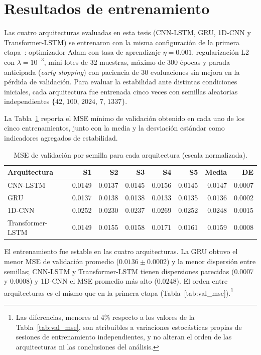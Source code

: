 \documentclass{report}
\begin{document}

\section{Resultados de entrenamiento}
\label{sec:resultados_entrenamiento}

Las cuatro arquitecturas evaluadas en esta tesis (CNN-LSTM, GRU, 1D-CNN y Transformer-LSTM) se entrenaron con la misma configuración de la primera etapa~\cite{sanchez2025imputation}: optimizador Adam con tasa de aprendizaje $\eta = 0.001$, regularización L2 con $\lambda = 10^{-3}$, mini-lotes de 32 muestras, máximo de 300 épocas y parada anticipada (\textit{early stopping}) con paciencia de 30 evaluaciones sin mejora en la pérdida de validación. Para evaluar la estabilidad ante distintas condiciones iniciales, cada arquitectura fue entrenada cinco veces con semillas aleatorias independientes $\{42,\, 100,\, 2024,\, 7,\, 1337\}$.

La Tabla~\ref{tab:training_mse} reporta el MSE mínimo de validación obtenido
en cada uno de los cinco entrenamientos, junto con la media y la desviación
estándar como indicadores agregados de estabilidad.

\begin{table}[htbp]
\centering
\caption{MSE de validación por semilla para cada arquitectura (escala normalizada).}
\label{tab:training_mse}
\begin{tabular}{lrrrrrrr}
\toprule
\textbf{Arquitectura} &
\textbf{S1} & \textbf{S2} & \textbf{S3} & \textbf{S4} & \textbf{S5} &
\textbf{Media} & \textbf{DE} \\
\midrule
CNN-LSTM          & 0.0149 & 0.0137 & 0.0145 & 0.0156 & 0.0145
                  & 0.0147 & 0.0007 \\
GRU               & 0.0137 & 0.0138 & 0.0138 & 0.0133 & 0.0135
                  & 0.0136 & 0.0002 \\
1D-CNN            & 0.0252 & 0.0230 & 0.0237 & 0.0269 & 0.0252
                  & 0.0248 & 0.0015 \\
Transformer-LSTM  & 0.0149 & 0.0155 & 0.0158 & 0.0171 & 0.0161
                  & 0.0159 & 0.0008 \\
\bottomrule
\end{tabular}
\end{table}

El entrenamiento fue estable en las cuatro arquitecturas. La GRU obtuvo el menor MSE de validación promedio ($0.0136 \pm 0.0002$) y la menor dispersión entre semillas; CNN-LSTM y Transformer-LSTM tienen dispersiones parecidas ($0.0007$ y $0.0008$) y 1D-CNN el MSE promedio más alto ($0.0248$). El orden entre arquitecturas es el mismo que en la primera etapa (Tabla~\ref{tab:val_mse}).\footnote{Las diferencias, menores al 4\% respecto a los valores de la Tabla~\ref{tab:val_mse}, son atribuibles a variaciones estocásticas propias de sesiones de entrenamiento independientes, y no alteran el orden de las arquitecturas ni las conclusiones del análisis.}
\end{document}
